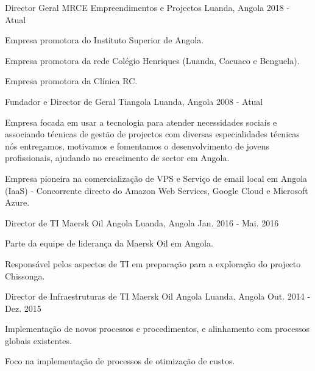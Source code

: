 \begin{cventries}

\cventry
{Director Geral} %
{MRCE Empreendimentos e Projectos} %
{Luanda, Angola} %
{2018 - Atual} %
{ %
\begin{cvitems}
    \item {Empresa promotora do Instituto Superior de Angola.}
    \item {Empresa promotora da rede Colégio Henriques (Luanda, Cacuaco e Benguela).}
    \item {Empresa promotora da Clínica RC.}
\end{cvitems}
}


\cventry
{Fundador e Director de Geral} %
{Tiangola} %
{Luanda, Angola} %
{2008 - Atual} %
{ %
\begin{cvitems}
\item {Empresa focada em usar a tecnologia para atender necessidades sociais e associando técnicas de gestão de projectos com diversas especialidades técnicas nós entregamos, motivamos e fomentamos o desenvolvimento de jovens profissionais, ajudando no crescimento de sector em Angola.}
\item {Empresa pioneira na comercialização de VPS e Serviço de email local em Angola (IaaS) - Concorrente directo do Amazon Web Services, Google Cloud e Microsoft Azure.}
\end{cvitems}
}


\cventry
{Director de TI} %
{Maersk Oil Angola} %
{Luanda, Angola} %
{Jan. 2016 - Mai. 2016} %
{ %
\begin{cvitems}
\item {Parte da equipe de liderança da Maersk Oil em Angola.}
\item {Responsável pelos aspectos de TI em preparação para a exploração do projecto Chissonga.}
\end{cvitems}
}


\cventry
{Director de Infraestruturas de TI} %
{Maersk Oil Angola} %
{Luanda, Angola} %
{Out. 2014 - Dez. 2015} %
{ %
\begin{cvitems}
\item {Implementação de novos processos e procedimentos, e alinhamento com processos globais existentes.}
\item {Foco na implementação de processos de otimização de custos.}
\end{cvitems}
}


\end{cventries}
